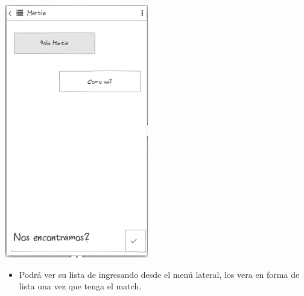 \documentclass[letterpaper,10pt,english]{sphinxmanual}
\begin{document}
\includegraphics{chat.png}
\begin{itemize}
\item {} 
Podrá ver su lista de ingresando desde el menú lateral, los vera en forma de lista una vez que tenga el match.

\end{itemize}
\end{document}
